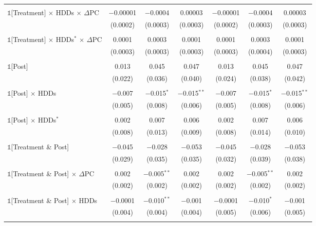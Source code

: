 \begin{table}[!htbp]
\begin{tabular}{@{\extracolsep{95pt}}lcccccc}
  & & & & & & \\ 
 $\mathbb{1}$[Treatment] $\times$ HDDs $\times$ $\Delta$PC & $-$0.00001 & $-$0.0004 & 0.00003 & $-$0.00001 & $-$0.0004 & 0.00003 \\ 
  & (0.0002) & (0.0003) & (0.0003) & (0.0002) & (0.0003) & (0.0003) \\ 
  & & & & & & \\ 
 $\mathbb{1}$[Treatment] $\times$ HDDs$^{*}$ $\times$ $\Delta$PC & 0.0001 & 0.0003 & 0.0001 & 0.0001 & 0.0003 & 0.0001 \\ 
  & (0.0003) & (0.0003) & (0.0003) & (0.0003) & (0.0004) & (0.0003) \\ 
  & & & & & & \\ 
 $\mathbb{1}$[Post] & 0.013 & 0.045 & 0.047 & 0.013 & 0.045 & 0.047 \\ 
  & (0.022) & (0.036) & (0.040) & (0.024) & (0.038) & (0.042) \\ 
  & & & & & & \\ 
 $\mathbb{1}$[Post] $\times$ HDDs & $-$0.007 & $-$0.015$^{*}$ & $-$0.015$^{**}$ & $-$0.007 & $-$0.015$^{*}$ & $-$0.015$^{**}$ \\ 
  & (0.005) & (0.008) & (0.006) & (0.005) & (0.008) & (0.006) \\ 
  & & & & & & \\ 
 $\mathbb{1}$[Post] $\times$ HDDs$^{*}$ & 0.002 & 0.007 & 0.006 & 0.002 & 0.007 & 0.006 \\ 
  & (0.008) & (0.013) & (0.009) & (0.008) & (0.014) & (0.010) \\ 
  & & & & & & \\ 
 $\mathbb{1}$[Treatment \& Post] & $-$0.045 & $-$0.028 & $-$0.053 & $-$0.045 & $-$0.028 & $-$0.053 \\ 
  & (0.029) & (0.035) & (0.035) & (0.032) & (0.039) & (0.038) \\ 
  & & & & & & \\ 
 $\mathbb{1}$[Treatment \& Post] $\times$ $\Delta$PC & 0.002 & $-$0.005$^{**}$ & 0.002 & 0.002 & $-$0.005$^{**}$ & 0.002 \\ 
  & (0.002) & (0.002) & (0.002) & (0.002) & (0.002) & (0.002) \\ 
  & & & & & & \\ 
 $\mathbb{1}$[Treatment \& Post] $\times$ HDDs & $-$0.0001 & $-$0.010$^{**}$ & $-$0.001 & $-$0.0001 & $-$0.010$^{*}$ & $-$0.001 \\ 
  & (0.004) & (0.004) & (0.004) & (0.005) & (0.006) & (0.005) \\ 
  & & & & & & \\ 

\end{tabular}
\end{table}
